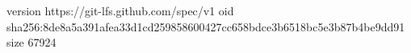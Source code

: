 version https://git-lfs.github.com/spec/v1
oid sha256:8de8a5a391afea33d1cd259858600427cc658bdce3b6518bc5e3b87b4be9dd91
size 67924
